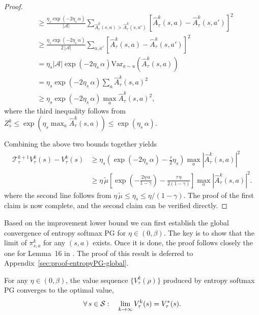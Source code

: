 \begin{proof}
\begin{align*}
&\geq \frac{\eta_s\exp(-2\eta_s\,\alpha)}{|\mathcal{A}|}\sum_{\hat{A}_\tau^k(s,a)>\hat{A}_\tau^k(s,a')}\left[\hat{A}_\tau^k(s,a)-\hat{A}_\tau^k(s,a')\right]^2\\
&\geq \frac{\eta_s\exp(-2\eta_s\,\alpha)}{2\,|\mathcal{A}|}\sum_{a,a'}\left[\hat{A}_\tau^k(s,a)-\hat{A}_\tau^k(s,a')\right]^2\\
&=\eta_s|\mathcal{A}|\exp(-2\eta_s\,\alpha)\mathrm{Var}_{a\sim u}\left(\hat{A}_\tau^k(s,a)\right)\\
&=\eta_s\exp(-2\eta_s\,\alpha)\sum_a \hat{A}_\tau^k(s,a)^2\\
&\geq \eta_s\exp(-2\eta_s\,\alpha)\max_a \hat{A}_\tau^k(s,a)^2,
\end{align*}
where the third inequality follows from $Z_s^k\leq \exp(\eta_s\max_a\hat{A}_\tau^k(s,a))\leq \exp(\eta_s\,\alpha)$.

Combining the above two bounds together yields
\begin{align*}
\mathcal{T}_\tau^{k+1}V_\tau^k(s)-V_\tau^k(s)&\geq \eta_s\left(\exp(-2\eta_s\,\alpha)-\frac{\tau}{2}\eta_s\right)\max_a |\hat{A}_\tau^k(s,a)|^2\\
&\geq\eta\,\tilde{\mu}\left[\exp\left(-\frac{2\eta\,\alpha}{1-\gamma}\right)-\frac{\tau\,\eta}{2(1-\gamma)}\right]\max_a |\hat{A}_\tau^k(s,a)|^2.
\end{align*}
where the second line follows from $\eta\,\tilde{\mu}\leq\eta_s\leq\eta/(1-\gamma)$. The proof of the first claim is now complete, and the second claim can be verified directly.
\end{proof}

Based on the improvement lower bound we can first establish the global convergence of entropy softmax PG for $\eta\in(0,\beta)$.  The key is to show that the limit of $\pi^k_{s,a}$ for any $(s,a)$ exists. Once it is done, the proof follows closely the one for Lemma~16 in \cite{Mei_Xiao_Szepesvari_Schuurmans_2020}. The proof of this result is deferred  to Appendix~\ref{sec:proof-entropyPG-global}.
\begin{lemma}\label{lem:entropyPG-global}
   For any $\eta\in(0,\beta)$, the value sequence $\{ V^k_\tau(\rho) \}$ produced by entropy softmax PG converges to the optimal value, 
    \begin{align*}
        \forall \, s\in{\cal S}: \quad \lim_{k\to\infty} V^k_\tau(s) = V^*_\tau(s).
    \end{align*}
\end{lemma}

